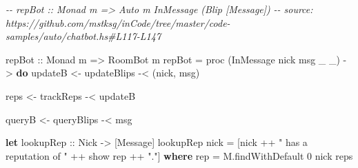 \documentclass[]{article}
\newenvironment{Shaded}{}{}
\newcommand{\CommentTok}[1]{\textcolor[rgb]{0.38,0.63,0.69}{\textit{#1}}}
\newcommand{\DataTypeTok}[1]{\textcolor[rgb]{0.56,0.13,0.00}{#1}}
\newcommand{\DecValTok}[1]{\textcolor[rgb]{0.25,0.63,0.44}{#1}}
\newcommand{\FunctionTok}[1]{\textcolor[rgb]{0.02,0.16,0.49}{#1}}
\newcommand{\KeywordTok}[1]{\textcolor[rgb]{0.00,0.44,0.13}{\textbf{#1}}}
\newcommand{\NormalTok}[1]{#1}
\newcommand{\OperatorTok}[1]{\textcolor[rgb]{0.40,0.40,0.40}{#1}}
\newcommand{\OtherTok}[1]{\textcolor[rgb]{0.00,0.44,0.13}{#1}}
\newcommand{\StringTok}[1]{\textcolor[rgb]{0.25,0.44,0.63}{#1}}
\begin{document}
\begin{Shaded}
\begin{Highlighting}[]
\CommentTok{{-}{-} repBot :: Monad m => Auto m InMessage (Blip [Message])}
\CommentTok{{-}{-} source: https://github.com/mstksg/inCode/tree/master/code{-}samples/auto/chatbot.hs\#L117{-}L147}

\OtherTok{repBot ::} \DataTypeTok{Monad}\NormalTok{ m }\OtherTok{=>} \DataTypeTok{RoomBot}\NormalTok{ m}
\NormalTok{repBot }\OtherTok{=}\NormalTok{ proc (}\DataTypeTok{InMessage}\NormalTok{ nick msg \_ \_) }\OtherTok{{-}>} \KeywordTok{do}
\NormalTok{    updateB }\OtherTok{<{-}}\NormalTok{ updateBlips }\OperatorTok{{-}<}\NormalTok{ (nick, msg)}

\NormalTok{    reps    }\OtherTok{<{-}}\NormalTok{ trackReps   }\OperatorTok{{-}<}\NormalTok{ updateB}

\NormalTok{    queryB  }\OtherTok{<{-}}\NormalTok{ queryBlips  }\OperatorTok{{-}<}\NormalTok{ msg}

    \KeywordTok{let}\OtherTok{ lookupRep ::} \DataTypeTok{Nick} \OtherTok{{-}>}\NormalTok{ [}\DataTypeTok{Message}\NormalTok{]}
\NormalTok{        lookupRep nick }\OtherTok{=}\NormalTok{ [nick }\OperatorTok{++} \StringTok{" has a reputation of "} \OperatorTok{++} \FunctionTok{show}\NormalTok{ rep }\OperatorTok{++} \StringTok{"."}\NormalTok{]}
          \KeywordTok{where}
\NormalTok{            rep }\OtherTok{=}\NormalTok{ M.findWithDefault }\DecValTok{0}\NormalTok{ nick reps}


\end{Highlighting}
\end{Shaded}
\end{document}
